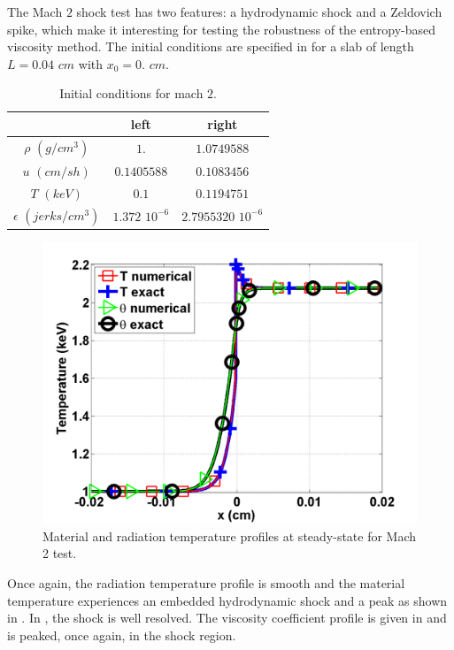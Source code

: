 The Mach $2$ shock test has two features: a hydrodynamic shock and a Zeldovich spike, which make it interesting for testing the robustness of the entropy-based viscosity method. The initial conditions are specified in  for a slab of length $L=0.04$ $cm$ with $x_0 = 0.$ $cm$.
\begin{table}[H]
\caption{\label{tbl:table5} Initial conditions for mach $2$.}
\begin{center}
\begin{tabular}{|c|c|c|}
\hline 
 & left  & right \\ \hline
$\rho$ $(g/cm^3)$ &$1.$ & $1.0749588$ \\ \hline
$u$ $(cm/sh)$& $0.1405588$ & $0.1083456$ \\ \hline
$T$ $(keV)$& $0.1$ & $0.1194751$\\ \hline
$\epsilon$ $(jerks/cm^3)$ & $1.372$ $10^{-6}$ & $2.7955320$ $10^{-6}$\\
\hline
\end{tabular}  
\end{center}  
\end{table}
\begin{figure}[H]
                \centering
                \includegraphics[width=\textwidth]{figures/Mach_2_nel_2000_temperature.png}
        \caption{Material and radiation temperature profiles at steady-state for Mach 2 test.}\label{fig:Mach2_temp}
\end{figure}
Once again, the radiation temperature profile is smooth and the material temperature experiences an embedded hydrodynamic shock and a peak as shown in . In , the shock is well resolved. The viscosity coefficient profile is given in  and is peaked, once again, in the shock region. 

